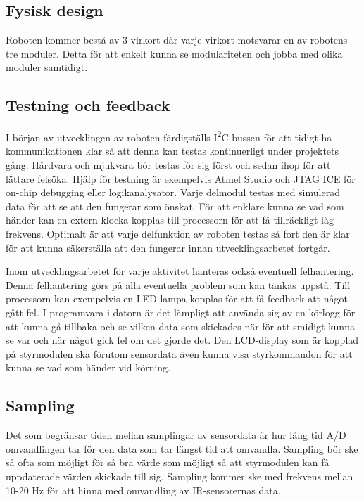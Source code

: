 \documentclass[11pt]{article}
\begin{document}
\begin{flushleft}
\subsection{Fysisk design}
Roboten kommer bestå av 3 virkort där varje virkort motsvarar en av robotens tre moduler. Detta för att enkelt kunna se modulariteten och jobba med olika moduler samtidigt.

\subsection{Testning och feedback}
I början av utvecklingen av roboten färdigställs I\textsuperscript{2}C-bussen för att tidigt ha kommunikationen klar så att denna kan testas kontinuerligt under projektets gång. Hårdvara och mjukvara bör testas för sig först och sedan ihop för att lättare felsöka. Hjälp för testning är exempelvis Atmel Studio och JTAG ICE för on-chip debugging eller logikanalysator. Varje delmodul testas med simulerad data för att se att den fungerar som önskat. För att enklare kunna se vad som händer kan en extern klocka kopplas till processorn för att få tillräckligt låg frekvens. Optimalt är att varje delfunktion av roboten testas så fort den är klar för att kunna säkerställa att den fungerar innan utvecklingsarbetet fortgår.  

Inom utvecklingsarbetet för varje aktivitet hanteras också eventuell felhantering. Denna felhantering görs på alla eventuella problem som kan tänkas uppstå. Till processorn kan exempelvis en LED-lampa kopplas för att få feedback att något gått fel. I programvara i datorn är det lämpligt att använda sig av en körlogg för att kunna gå tillbaka och se vilken data som skickades när för att smidigt kunna se var och när något gick fel om det gjorde det. Den LCD-display som är kopplad på styrmodulen ska förutom sensordata även kunna visa styrkommandon för att kunna se vad som händer vid körning.

\subsection{Sampling}
Det som begränsar tiden mellan samplingar av sensordata är hur lång tid A/D omvandlingen tar för den data som tar längst tid att omvandla. Sampling bör ske så ofta som möjligt för så bra värde som möjligt så att styrmodulen kan få uppdaterade värden skickade till sig. Sampling kommer ske med frekvens mellan 10-20 Hz för att hinna med omvandling av IR-sensorernas data. 
 

\pagebreak
{}



\end{flushleft}
\end{document}
